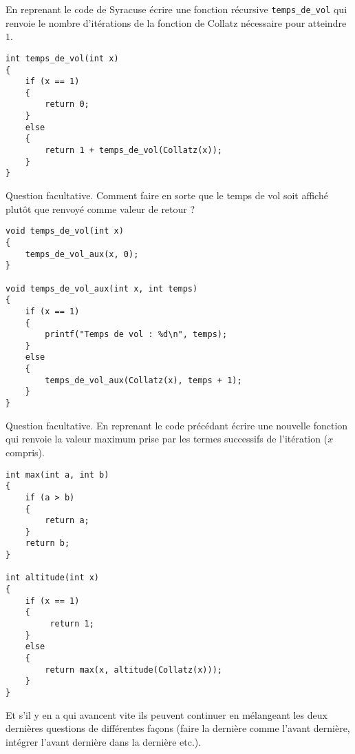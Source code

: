 \begin{newenu}
\item En reprenant le code de Syracuse écrire une fonction récursive
  \verb+temps_de_vol+ qui renvoie le nombre d'itérations de la
  fonction de Collatz nécessaire pour atteindre $1$.

\begin{correction}
\begin{verbatim}
int temps_de_vol(int x)
{
    if (x == 1)
    {
        return 0;
    }
    else 
    {       
        return 1 + temps_de_vol(Collatz(x));
    }
}
\end{verbatim}
\end{correction}
\item Question facultative. Comment faire en sorte que le temps de vol soit affiché plutôt que renvoyé comme valeur de retour ?
\begin{correction}
\begin{verbatim}
void temps_de_vol(int x)
{
    temps_de_vol_aux(x, 0);
}

void temps_de_vol_aux(int x, int temps)
{
    if (x == 1)
    {
        printf("Temps de vol : %d\n", temps);
    }
    else 
    {       
        temps_de_vol_aux(Collatz(x), temps + 1);
    }
}
\end{verbatim}
\end{correction}

\item Question facultative. En reprenant le code précédant écrire une nouvelle fonction  qui renvoie la valeur maximum prise par les termes successifs de l'itération ($x$ compris).
\begin{correction}
\begin{verbatim}
int max(int a, int b)
{
    if (a > b)
    {
        return a;
    }
    return b;
}

int altitude(int x)
{
    if (x == 1)
    {
         return 1;
    }
    else 
    {       
        return max(x, altitude(Collatz(x)));
    }
}
\end{verbatim}

  Et s'il y en a qui avancent vite ils peuvent continuer en mélangeant les deux dernières questions de différentes façons (faire la dernière comme l'avant dernière, intégrer l'avant dernière dans la dernière etc.). 
\end{correction}
\end{newenu}

